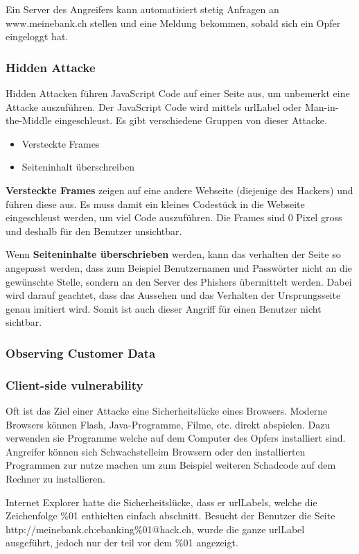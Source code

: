 Ein Server des Angreifers kann automatisiert stetig Anfragen an www.meinebank.ch stellen und eine Meldung bekommen, sobald sich ein Opfer eingeloggt hat.

\subsubsection{Hidden Attacke}
Hidden Attacken führen JavaScript Code auf einer Seite aus, um unbemerkt eine Attacke auszuführen. Der JavaScript Code wird mittels \Gls{urlLabel} oder Man-in-the-Middle eingeschleust. Es gibt verschiedene Gruppen von dieser Attacke.
\begin{itemize}
\item Versteckte Frames
\item Seiteninhalt überschreiben
\end{itemize}
\textbf{Versteckte Frames} zeigen auf eine andere Webseite (diejenige des Hackers) und führen diese aus. Es muss damit ein kleines Codestück in die Webseite eingeschleust werden, um viel Code auszuführen. Die Frames sind 0 Pixel gross und deshalb für den Benutzer unsichtbar.

Wenn \textbf{Seiteninhalte überschrieben} werden, kann das verhalten der Seite so angepasst werden, dass zum Beispiel Benutzernamen und Passwörter nicht an die gewünschte Stelle, sondern an den Server des Phishers übermittelt werden. Dabei wird darauf geachtet, dass das Aussehen und das Verhalten der Ursprungsseite genau imitiert wird. Somit ist auch dieser Angriff für einen Benutzer nicht sichtbar.

\subsubsection{Observing Customer Data}


\subsubsection{Client-side vulnerability}
Oft ist das Ziel einer Attacke eine Sicherheitslücke eines Browsers. Moderne Browsers können Flash, Java-Programme, Filme, etc. direkt abspielen. Dazu verwenden sie Programme welche auf dem Computer des Opfers installiert sind. Angreifer können sich Schwachstelleim Browsern oder den installierten Programmen zur nutze machen um zum Beispiel weiteren Schadcode auf dem Rechner zu installieren. 

Internet Explorer hatte die Sicherheitslücke, dass er \Glspl{urlLabel}, welche die Zeichenfolge \%01 enthielten einfach abschnitt. Besucht der Benutzer die Seite \\
http://meinebank.ch:ebanking\%01@hack.ch, wurde die ganze \Gls{urlLabel} ausgeführt, jedoch nur der teil vor dem \%01 angezeigt.

